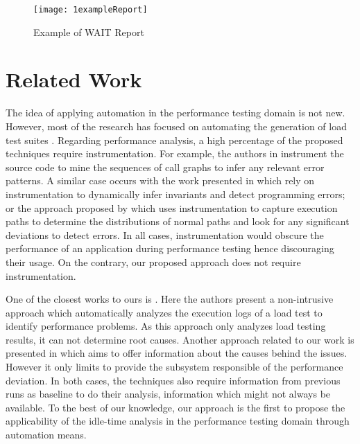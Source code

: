 \documentclass[runningheads,a4paper]{llncs}
\begin{document}
\vspace{-5pt}
\begin{figure}[!h]
\centering
\texttt{[image: 1exampleReport]}
\caption{Example of WAIT Report}
\label{fig_WAITReport}
\end{figure}

\vspace{-10pt}
\section{Related Work}
\vspace{-5pt}
The idea of applying automation in the performance testing domain is not new.
However, most of the research has focused on automating the generation of load
test suites
\cite{Chen1,Elvira1,Zhang1,Briand1,Bayan1,Avritzer2,Avritzer3,Garousi1}.
Regarding performance analysis, a high percentage of the proposed
techniques require instrumentation. For example, the authors in \cite{Yang1}
instrument the source code to mine the sequences of call graphs to infer any
relevant error patterns. A similar case occurs with the work presented in
\cite{Hangal1,Csallner1} which rely on instrumentation to dynamically infer
invariants and detect programming errors; or the approach proposed by
\cite{Chen2} which uses instrumentation to capture execution paths to determine
the distributions of normal paths and look for any significant deviations to
detect errors. In all cases, instrumentation would obscure the performance of an
application during performance testing hence discouraging their usage. On the
contrary, our proposed approach does not require instrumentation.

One of the closest works to ours is \cite{Jiang2009}. Here the authors present a
non-intrusive approach which automatically analyzes the execution logs of a load
test to identify performance problems. As this approach only analyzes load
testing results, it can not determine root causes. Another approach related
to our work is presented in \cite{Malik1} which aims to offer information about
the causes behind the issues. However it only limits to provide the subsystem
responsible of the performance deviation. In both cases, the techniques also
require information from previous runs as baseline to do their analysis,
information which might not always be available. To the best of our knowledge,
our approach is the first to propose the applicability of the idle-time analysis
in the performance testing domain through automation means.
\end{document}
